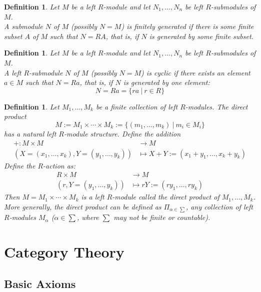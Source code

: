 \documentclass[a4paper,8pt]{article}
\newcommand{\hlt}[1]{\textit{{\color{blue}#1}}}
\theoremstyle{theorem}
\newtheorem{definition}[theorem]{Definition}
\begin{document}
\begin{definition}
Let $M$ be a left $R$-module and let $N_1, \ldots, N_n$ be left $R$-submodules of $M$.\\
A submodule $N$ of $M$ (possibly $N=M$) is \hlt{finitely generated} if there is some finite subset $A$ of $M$ such that $N=RA$, that is, if $N$ is generated by some finite subset.
\end{definition}

\begin{definition}
Let $M$ be a left $R$-module and let $N_1, \ldots, N_n$ be left $R$-submodules of $M$.\\
A left $R$-submodule $N$ of $M$ (possibly $N=M$) is \hlt{cyclic} if there exists an element $a \in M$ such that $N = Ra$, that is, if $N$ is generated by one element:
\begin{equation}
N = Ra = \{ra \ | \ r \in R\} \nonumber
\end{equation}
\end{definition}

\begin{definition}
Let $M_1, \ldots, M_k$ be a finite collection of left $R$-modules. The direct product
\begin{equation}
M := M_1 \times \cdots \times M_k := \{(m_1, \ldots, m_k) \ | \ m_i \in M_i\} \nonumber
\end{equation}	
has a natural left $R$-module structure. Define the addition
\begin{align}
+ : M \times M &\rightarrow M \nonumber \\
(X = (x_1, \ldots, x_k), Y = (y_1, \ldots, y_k)) &\mapsto X + Y := (x_1 + y_1, \ldots, x_k + y_k) \nonumber
\end{align}
Define the $R$-action as:
\begin{align}
R \times M &\rightarrow M \nonumber \\
(r, Y=(y_1, \ldots, y_k)) &\mapsto rY := (ry_1, \ldots, ry_k) \nonumber
\end{align}
Then $M = M_1 \times \cdots \times M_k$ is a left $R$-module called the \hlt{direct product} of $M_1, \ldots, M_k$. \\
More generally, the direct product can be defined as $\Pi_{\alpha \in \sum}$, any collection of left $R$-modules $M_{\alpha}$ ($\alpha \in \sum$, where $\sum$ may not be finite or countable).
\end{definition}


\newpage

\section{Category Theory}
\subsection{Basic Axioms}
\end{document}

